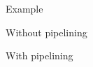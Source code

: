 \documentclass[notes xcolor=dvipsnames]{beamer}
\begin{document}
    \begin{frame}{Example}

        Without pipelining
        \begin{figure}
        \end{figure}
             
        With pipelining
        \begin{figure}
        \end{figure}     
        
    \end{frame}
\end{document}
